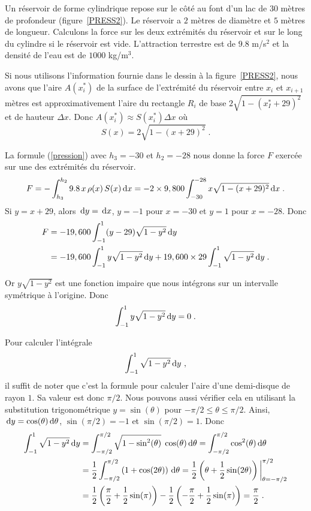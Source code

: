 {\begin{egg}
Un réservoir de forme cylindrique repose sur le côté au font d'un lac de $30$
mètres de profondeur (figure~\ref{PRESS2}). Le réservoir a $2$ mètres
de diamètre et $5$ mètres de longueur.  Calculons la force sur les
deux extrémités du réservoir et sur le long du cylindre si le
réservoir est vide. L'attraction terrestre est de $9.8$ m/s$^2$ et la
densité de l'eau est de $1000$ kg/m$^3$.


Si nous utilisons l'information fournie dans le dessin à la
figure~\ref{PRESS2}, nous avons que l'aire $A(x_i^\ast)$ de la surface
de l'extrémité du réservoir entre $x_i$ et $x_{i+1}$ mètres est
approximativement l'aire du rectangle $R_i$ de base
$2\sqrt{1-(x_I^\ast + 29)^2}$ et de hauteur $\Delta x$.  Donc
$A(x_i^\ast) \approx S(x_i^\ast) \Delta x$ où
\[
S(x) = 2\sqrt{1-(x+29)^2} \; .
\]

La formule (\ref{pression}) avec $h_3=-30$ et $h_2 =-28$ nous donne la
force $F$ exercée sur une des extrémités du réservoir.
\[
F = -\int_{h_3}^{h_2} 9.8 \, x\, \rho(x)\, S(x)\,\mathrm{d}x
= - 2\times 9,800 \int_{-30}^{-28} x\sqrt{1-(x+29)^2} \,\mathrm{d}x \; .
\]
Si $y = x+29$, alors $\,\mathrm{d}y = \,\mathrm{d}x$, $y=-1$
pour $x=-30$ et $y=1$ pour $x=-28$.  Donc
\begin{align*}
F &= -19,600 \int_{-1}^{1} (y-29)\sqrt{1-y^2} \,\mathrm{d}y \\
&= -19,600 \int_{-1}^{1} y\sqrt{1-y^2} \,\mathrm{d}y
+ 19,600\times 29 \int_{-1}^{1} \sqrt{1-y^2} \,\mathrm{d}y \; .
\end{align*}

Or $y\sqrt{1-y^2}$ est une fonction impaire que nous intégrons sur un
intervalle symétrique à l'origine.  Donc
\[
\int_{-1}^{1} y\sqrt{1-y^2} \,\mathrm{d}y = 0 \; .
\]

Pour calculer l'intégrale
\[
\int_{-1}^{1} \sqrt{1-y^2} \,\mathrm{d}y \ ,
\]
il suffit de noter que c'est la formule pour calculer l'aire d'une
demi-disque de rayon $1$.  Sa valeur est donc $\pi/2$.
Nous pouvons aussi vérifier cela en utilisant la substitution
trigonométrique $y=\sin(\theta)$ pour $-\pi/2 \leq \theta \leq \pi/2$.
Ainsi, $\,\mathrm{d}y = \cos(\theta) \,\mathrm{d}\theta$,
$\sin(\pi/2) = -1$ et $\sin(\pi/2) = 1$.  Donc 
\begin{align*}
\int_{-1}^1 \sqrt{1-y^2} \,\mathrm{d}y
&= \int_{-\pi/2}^{\pi/2} \sqrt{1-\sin^2(\theta)} \; \cos(\theta) \,\mathrm{d}\theta
= \int_{-\pi/2}^{\pi/2} \cos^2(\theta) \,\mathrm{d}\theta \\
&= \frac{1}{2} \int_{-\pi/2}^{\pi/2}
\left(1 + \cos(2\theta)\right) \,\mathrm{d}\theta
= \frac{1}{2} \left(\theta + \frac{1}{2}\sin(2\theta)\right)
\bigg|_{\theta=-\pi/2}^{\pi/2} \\
&= \frac{1}{2} \left(\frac{\pi}{2} + \frac{1}{2}\sin(\pi)\right)
- \frac{1}{2} \left(-\frac{\pi}{2} + \frac{1}{2}\sin(\pi)\right)
= \frac{\pi}{2} \; .
\end{align*}


\end{egg}}
